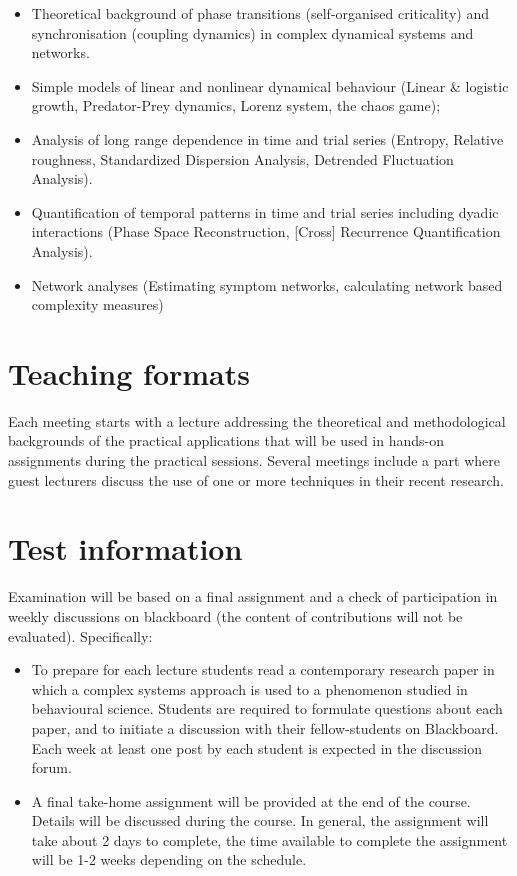 \documentclass[12pt,]{book}
\providecommand{\tightlist}{%
  \setlength{\itemsep}{0pt}\setlength{\parskip}{0pt}}
\let\stdsection\section
\renewcommand\section{\newpage\stdsection}
\theoremstyle{definition}
\theoremstyle{definition}
\theoremstyle{definition}
\theoremstyle{remark}
\begin{document}
\begin{itemize}
\tightlist
\item
  Theoretical background of phase transitions (self-organised
  criticality) and synchronisation (coupling dynamics) in complex
  dynamical systems and networks.
\item
  Simple models of linear and nonlinear dynamical behaviour (Linear \&
  logistic growth, Predator-Prey dynamics, Lorenz system, the chaos
  game);
\item
  Analysis of long range dependence in time and trial series (Entropy,
  Relative roughness, Standardized Dispersion Analysis, Detrended
  Fluctuation Analysis).
\item
  Quantification of temporal patterns in time and trial series including
  dyadic interactions (Phase Space Reconstruction, {[}Cross{]}
  Recurrence Quantification Analysis).
\item
  Network analyses (Estimating symptom networks, calculating network
  based complexity measures)
\end{itemize}

\section*{Teaching formats}\label{teaching-formats}

Each meeting starts with a lecture addressing the theoretical and
methodological backgrounds of the practical applications that will be
used in hands-on assignments during the practical sessions. Several
meetings include a part where guest lecturers discuss the use of one or
more techniques in their recent research.

\section*{Test information}\label{test-information}

Examination will be based on a final assignment and a check of
participation in weekly discussions on blackboard (the content of
contributions will not be evaluated). Specifically:

\begin{itemize}
\tightlist
\item
  To prepare for each lecture students read a contemporary research
  paper in which a complex systems approach is used to a phenomenon
  studied in behavioural science. Students are required to formulate
  questions about each paper, and to initiate a discussion with their
  fellow-students on Blackboard. Each week at least one post by each
  student is expected in the discussion forum.
\item
  A final take-home assignment will be provided at the end of the
  course. Details will be discussed during the course. In general, the
  assignment will take about 2 days to complete, the time available to
  complete the assignment will be 1-2 weeks depending on the schedule.
\end{itemize}
\end{document}
